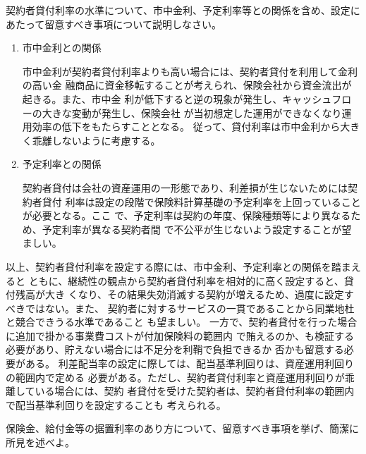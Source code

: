 \documentclass[report,gutter=10mm,fore-edge=10mm,uplatex,dvipdfmx]{jlreq}
\begin{document}

契約者貸付利率の水準について、市中金利、予定利率等との関係を含め、設定にあたって留意すべき事項について説明しなさい。



\begin{enumerate}
\tightlist
\item
  市中金利との関係

  市中金利が契約者貸付利率よりも高い場合には、契約者貸付を利用して金利の高い金
融商品に資金移転することが考えられ、保険会社から資金流出が起きる。また、市中金
利が低下すると逆の現象が発生し、キャッシュフローの大きな変動が発生し、保険会社
が当初想定した運用ができなくなり運用効率の低下をもたらすこととなる。
従って、貸付利率は市中金利から大きく乖離しないように考慮する。

\item
  予定利率との関係

契約者貸付は会社の資産運用の一形態であり、利差損が生じないためには契約者貸付
利率は設定の段階で保険料計算基礎の予定利率を上回っていることが必要となる。ここ
で、予定利率は契約の年度、保険種類等により異なるため、予定利率が異なる契約者間
で不公平が生じないよう設定することが望ましい。

\end{enumerate}

以上、契約者貸付利率を設定する際には、市中金利、予定利率との関係を踏まえると
ともに、継続性の観点から契約者貸付利率を相対的に高く設定すると、貸付残高が大き
くなり、その結果失効消滅する契約が増えるため、過度に設定すべきではない。また、
契約者に対するサービスの一貫であることから同業地杜と競合できうる水準であること
も望ましい。
一方で、契約者貸付を行った場合に追加で掛かる事業費コストが付加保険料の範囲内
で賄えるのか、も検証する必要があり、貯えない場合には不足分を利鞘で負担できるか
否かも留意する必要がある。
利差配当率の設定に際しては、配当基準利回りは、資産運用利回りの範囲内で定める
必要がある。ただし、契約者貸付利率と資産運用利回りが乖離している場合には、契約
者貸付を受けた契約者は、契約者貸付利率の範囲内で配当基準利回りを設定することも
考えられる。

保険金、給付金等の据置利率のあり方について、留意すべき事項を挙げ、簡潔に所見を述べよ。

\end{document}
